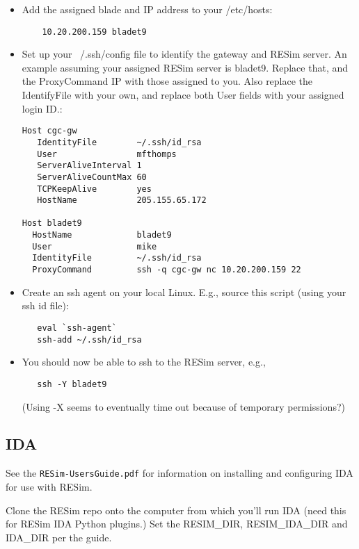 \documentclass[titlepage]{article}
\begin{document}
\begin{itemize}

\item Add the assigned blade and IP address to your /etc/hosts:
\begin{verbatim}
    10.20.200.159 bladet9
\end{verbatim}

\item Set up your ~/.ssh/config file to identify the gateway and RESim server.  An example
assuming your assigned RESim server is bladet9.  Replace that, and the ProxyCommand IP with 
those assigned to you.  Also replace the IdentifyFile with your own,
and replace both User fields with your assigned login ID.:

\begin{verbatim}
Host cgc-gw
   IdentityFile        ~/.ssh/id_rsa
   User                mfthomps
   ServerAliveInterval 1
   ServerAliveCountMax 60
   TCPKeepAlive        yes
   HostName            205.155.65.172

Host bladet9
  HostName             bladet9
  User                 mike
  IdentityFile         ~/.ssh/id_rsa
  ProxyCommand         ssh -q cgc-gw nc 10.20.200.159 22
\end{verbatim}

\item Create an ssh agent on your local Linux.  E.g., source this script (using
your ssh id file):

\begin{verbatim}
   eval `ssh-agent`
   ssh-add ~/.ssh/id_rsa
\end{verbatim}

\item You should now be able to ssh to the RESim server, e.g., 
\begin{verbatim}
   ssh -Y bladet9
\end{verbatim}
(Using -X seems to eventually time out because of temporary permissions?)

\end{itemize}

\subsection{IDA}
See the {\tt RESim-UsersGuide.pdf} for information on installing and configuring IDA for use with 
RESim.  

Clone the RESim repo onto the computer from which you'll run IDA (need this for RESim
IDA Python plugins.)  Set the RESIM\_DIR, RESIM\_IDA\_DIR and IDA\_DIR per the guide.
\end{document}
